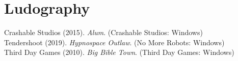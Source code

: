 \section{Ludography}
Crashable Studios (2015). \textit{Alum}. (Crashable Studios: Windows)\\
Tendershoot (2019). \textit{Hypnospace Outlaw}. (No More Robots: Windows)\\
Third Day Games (2010). \textit{Big Bible Town}. (Third Day Games: Windows)